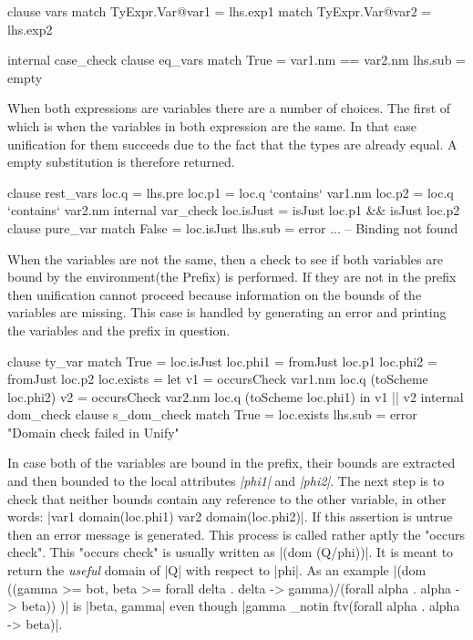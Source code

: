 \begin{code}
clause vars
  match TyExpr.Var@var1 = lhs.exp1
  match TyExpr.Var@var2 = lhs.exp2
  
  internal case_check
    clause eq_vars
      match True = var1.nm == var2.nm
      lhs.sub = empty
\end{code}
When both expressions are variables there are a number of choices. The first of which is when the variables in both expression are the same. In that case unification for them succeeds due to the fact that the types are already equal. A empty substitution is therefore returned.

\begin{code}
clause rest_vars
  loc.q  = lhs.pre
  loc.p1 = loc.q `contains` var1.nm
  loc.p2 = loc.q `contains` var2.nm
  internal var_check
    loc.isJust    = isJust loc.p1 && isJust loc.p2
    clause pure_var
      match False = loc.isJust
      lhs.sub = error ... -- Binding not found
\end{code}
When the variables are not the same, then a check to see if both variables are bound by the environment(the Prefix) is performed. If they are not in the prefix then unification cannot proceed because information on the bounds of the variables are missing. This case is handled by generating an error and printing the variables and the prefix in question.

\begin{code} 
clause ty_var
  match True  = loc.isJust
  loc.phi1 = fromJust loc.p1
  loc.phi2 = fromJust loc.p2
  loc.exists =  let  v1  = occursCheck var1.nm loc.q (toScheme loc.phi2)
                     v2  = occursCheck var2.nm loc.q (toScheme loc.phi1)
                in v1 || v2
  internal dom_check
    clause s_dom_check
      match True  = loc.exists
      lhs.sub     = error "Domain check failed in Unify"
\end{code}
In case both of the variables are bound in the prefix, their bounds are extracted and then bounded to the local attributes \emph{|phi1|} and \emph{|phi2|}. The next step is to check that neither bounds contain any reference to the other variable, in other words: |var1 \notin domain(loc.phi1) \cap var2 \notin domain(loc.phi2)|. If this assertion is untrue then an error message is generated. This process is called rather aptly the "occurs check".
This "occurs check" is usually written as |(dom (Q/phi))|. It is meant to return the \emph{useful} domain of |Q| with respect to |phi|\cite{HML}. As an example |(dom ((gamma >= bot, beta >= forall delta . delta -> gamma)/(forall alpha . alpha -> beta)) )| is |{beta, gamma}| even though |gamma _notin ftv(forall alpha . alpha -> beta)|. 

